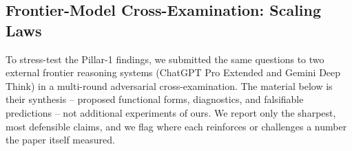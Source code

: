 %

\subsection{Frontier-Model Cross-Examination: Scaling Laws}
\label{sec:frontier-scaling}

To stress-test the Pillar-1 findings, we submitted the same questions to two
external frontier reasoning systems (ChatGPT Pro Extended and Gemini Deep
Think) in a multi-round adversarial cross-examination. The material below is
their synthesis -- proposed functional forms, diagnostics, and falsifiable
predictions -- not additional experiments of ours. We report only the
sharpest, most defensible claims, and we flag where each reinforces or
challenges a number the paper itself measured.


